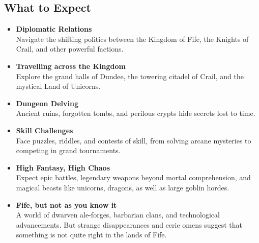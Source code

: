 \subsection*{What to Expect}
{\entryfont\begin{itemize}
	\renewcommand\labelitemi{\textbf{\textbullet}}
	\item \textbf{Diplomatic Relations}\\Navigate the shifting politics between the Kingdom of Fife, the Knights of Crail, and other powerful factions.
	\item \textbf{Travelling across the Kingdom}\\Explore the grand halls of Dundee, the towering citadel of Crail, and the mystical Land of Unicorns.
	\item \textbf{Dungeon Delving}\\Ancient ruins, forgotten tombs, and perilous crypts hide secrets lost to time.
	\item \textbf{Skill Challenges}\\Face puzzles, riddles, and contests of skill, from solving arcane mysteries to competing in grand tournaments.
	\item \textbf{High Fantasy, High Chaos}\\Expect epic battles, legendary weapons beyond mortal comprehension, and magical beasts like unicorns, dragons, as well as large goblin hordes.
	\item \textbf{Fife, but not as you know it}\\A world of dwarven ale-forges, barbarian clans, and technological advancements. But strange disappearances and eerie omens suggest that something is not quite right in the lands of Fife.
\end{itemize}}
\vfill\eject
